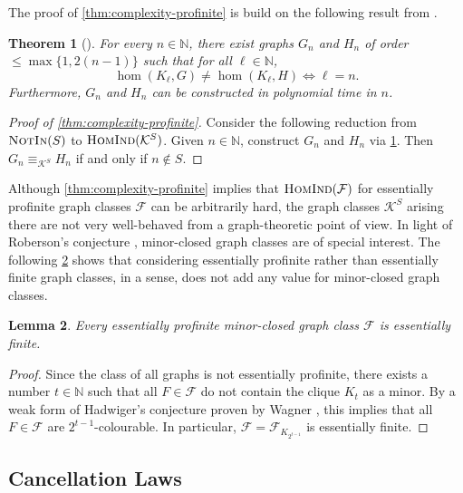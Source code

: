 \documentclass[3p,final]{elsarticle}
\newcommand{\HomInd}{\textup{\textsc{HomInd}}}
\newcommand{\Mem}{\textup{\textsc{NotIn}}}
\newtheorem{theorem}{Theorem}
\newtheorem{lemma}[theorem]{Lemma}
\begin{document}
	The proof of \cref{thm:complexity-profinite} is build on the following result from \cite{boeker_complexity_2019}.
	
	\begin{theorem}[{\cite[Corollary~14]{boeker_complexity_2019}}] \label{thm:boeker-cor14}
		For every $n \in \mathbb{N}$, 
		there exist graphs $G_n$ and $H_n$ of order $\leq \max\{1,2(n-1)\}$ such that for all $\ell \in \mathbb{N}$,
		\[
		\hom(K_\ell, G) \neq \hom(K_\ell, H) \iff \ell = n.
		\]
		Furthermore, $G_n$ and $H_n$ can be constructed in polynomial time in $n$.
	\end{theorem}
	
	\begin{proof}[Proof of \cref{thm:complexity-profinite}]
		Consider the following reduction from $\Mem(S)$ to $\HomInd(\mathcal{K}^S)$.
		Given $n \in \mathbb{N}$, construct $G_n$ and $H_n$ via \cref{thm:boeker-cor14}.
		Then $G_n \equiv_{\mathcal{K}^S} H_n$ if and only if $n \not\in S$.
	\end{proof}
	
	
	Although \cref{thm:complexity-profinite} implies that $\HomInd(\mathcal{F})$ for essentially profinite graph classes $\mathcal{F}$ can be arbitrarily hard, the graph classes $\mathcal{K}^S$ arising there are not very well-behaved from a graph-theoretic point of view.
	In light of Roberson's conjecture \cite{roberson_oddomorphisms_2022}, minor-closed graph classes are of special interest.
	The following \cref{lem:profinite-minor} shows that considering essentially profinite rather than essentially finite graph classes, in a sense, does not add any value for minor-closed graph classes.
	
	
	\begin{lemma} \label{lem:profinite-minor}
		Every essentially profinite minor-closed graph class $\mathcal{F}$ is essentially finite.
	\end{lemma}
	\begin{proof}Since the class of all graphs is not essentially profinite, there exists a number $t \in \mathbb{N}$ such that all $F \in \mathcal{F}$ do not contain the clique $K_t$ as a minor.
		By a weak form of Hadwiger's conjecture \cite{seymour_hadwigers_2016} proven by Wagner \cite{wagner_beweis_1964}, this implies that all $F \in \mathcal{F}$ are $2^{t-1}$-colourable.
		In particular, $\mathcal{F} = \mathcal{F}_{K_{2^{t-1}}}$ is essentially finite.
	\end{proof}


	\subsection{Cancellation Laws}
	
\end{document}
